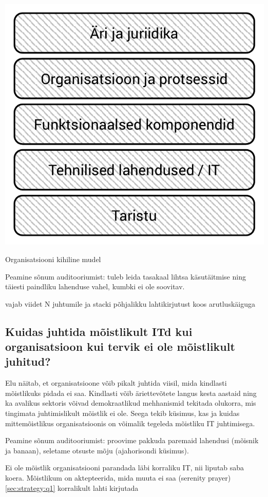 \begin{marginfigure}
	\begin{center}
		\includegraphics[width=\linewidth]{stack.pdf}
		\caption{Organisatsiooni kihiline mudel}
		\label{fig:stack}
	\end{center}
\end{marginfigure}

Peamine sõnum auditooriumist: tuleb leida tasakaal lihtsa käsutäitmise ning täiesti paindliku lahenduse vahel, kumbki ei ole soovitav.

\TODO vajab viidet N juhtumile ja stacki põhjalikku lahtikirjutust koos arutluskäiguga

\subsection{Kuidas juhtida mõistlikult ITd kui organisatsioon kui tervik ei ole mõistlikult juhitud?}
\label{sec:strategy:q3}
Elu näitab, et organisatsioone võib pikalt juhtida viisil, mida kindlasti mõistlikuks pidada ei saa. Kindlasti võib äriettevõtete langus kesta aastaid ning ka avalikus sektoris võivad demokraatlikud mehhanismid tekitada olukorra, mis tingimata juhtimislikult mõistlik ei ole. Seega tekib küsimus, kas ja kuidas mittemõistlikus organisatsioonis on võimalik tegeleda mõistliku IT juhtimisega.

Peamine sõnum auditooriumist: proovime pakkuda paremaid lahendusi (mõisnik ja banaan), seletame otsuste mõju (ajahorisondi küsimus).

Ei ole mõistlik organisatsiooni parandada läbi korraliku IT, nii liputab saba koera. Mõistlikum on aktepteerida, mida muuta ei saa (serenity prayer)
\ref{sec:strategy:q1}
\TODO korralikult lahti kirjutada
